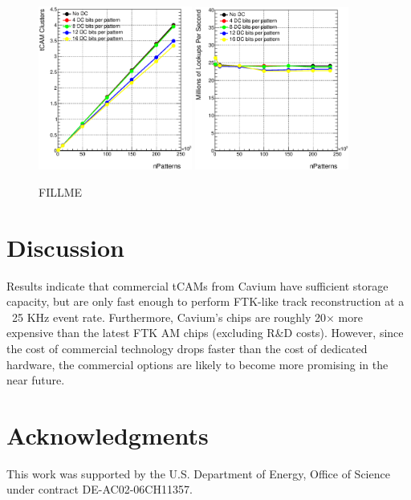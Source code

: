 \documentclass[preprint,prd,showpacs]{revtex4-1}
\begin{document}
\begin{figure}[!htb]
\begin{center}
\includegraphics[width=0.45\textwidth]{figures/PlotTcamData_eps/001}
\includegraphics[width=0.45\textwidth]{figures/PlotTcamData_eps/002}
\caption{FILLME}
\label{fig:nsp_perf_plots}
\end{center}
\end{figure}


\section{Discussion}\label{sec:Discussion}

Results indicate that commercial tCAMs from Cavium have sufficient storage capacity, but are only fast enough to perform FTK-like track reconstruction at a ~25 KHz event rate. Furthermore, Cavium's chips are  roughly 20× more expensive than the latest FTK AM chips (excluding R\&D costs). However, since the cost of commercial technology drops faster than the cost of dedicated hardware, the commercial options are likely to become more promising in the near future.

\section{Acknowledgments}
This work was supported by the U.S. Department of Energy, Office of Science under contract DE-AC02-06CH11357.


\end{document}
